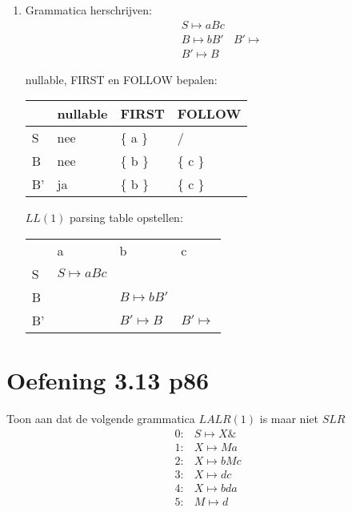 \begin{enumerate}
	\item Grammatica herschrijven:
	\begin{equation*}
	\begin{split}
	& S \mapsto aBc \\
	& B \mapsto bB'
	& B' \mapsto  \\
	& B' \mapsto B 
	\end{split}
	\end{equation*}
	
	nullable, FIRST en FOLLOW bepalen:
	\begin{table}[h]
		\centering
		\begin{tabular}{| l | l | l | l |}
			& nullable & FIRST & FOLLOW \\
			\hline
			S & nee  & \{ a \}    & /	 			\\
			B & nee  & \{ b \}    & \{ c \}	\\
			B' & ja  & \{ b \}    & \{ c \}			\\
			\hline
		\end{tabular}
	\end{table}

	$LL(1)$ parsing table opstellen:
	
	\begin{table}[h]
		\centering
		\begin{tabular}{| l | l | l | l |}
			\hline
			  & a 					& b & c \\
			S & $S \mapsto aBc$	    &   &   \\
			B &   					& $B \mapsto bB'$  &   \\
			B' &  & $B' \mapsto B$ & $B' \mapsto$
			\hline
		\end{tabular}
	\end{table}
	
\end{enumerate}

\section{Oefening 3.13 p86}
Toon aan dat de volgende grammatica $LALR(1)$ is maar niet $SLR$
\begin{equation*}
\begin{split}
0 :& S \mapsto X\& \\
1 :& X \mapsto Ma \\
2 :& X \mapsto bMc \\
3 :& X \mapsto dc \\
4 :& X \mapsto bda \\
5 :& M \mapsto d
\end{split}
\end{equation*}
